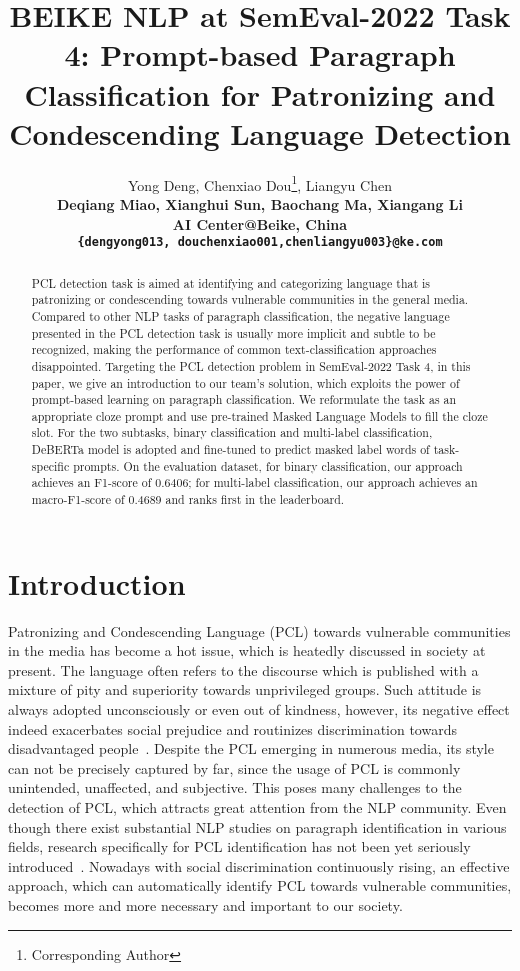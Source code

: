 \documentclass[11pt]{article}
\title{BEIKE NLP at SemEval-2022 Task 4: Prompt-based Paragraph Classification for Patronizing and Condescending Language Detection}
\author{Yong Deng, Chenxiao Dou\thanks{\quad Corresponding Author}, Liangyu Chen \\
  \bf{Deqiang Miao, Xianghui Sun, Baochang Ma, Xiangang Li} \\
  AI Center@Beike, China \\
  \texttt{\{dengyong013, douchenxiao001,chenliangyu003\}@ke.com}
}
\begin{document}
\maketitle


\begin{abstract}
  PCL detection task is aimed at identifying and categorizing language that is patronizing or condescending towards vulnerable communities in the general media. 
  Compared to other NLP tasks of paragraph classification, the negative language presented in the PCL detection task is usually more implicit and subtle to be recognized, making the performance of common text-classification approaches disappointed. 
  Targeting the PCL detection problem in SemEval-2022 Task 4, in this paper, we give an introduction to our team's solution, which exploits the power of prompt-based learning on paragraph classification.
  We reformulate the task as an appropriate cloze prompt and use pre-trained Masked Language Models to fill the cloze slot.
  For the two subtasks, binary classification and multi-label classification, DeBERTa model is adopted and fine-tuned to predict masked label words of task-specific prompts.
  On the evaluation dataset, for binary classification, our approach achieves an F1-score of 0.6406; for multi-label classification, our approach achieves an macro-F1-score of 0.4689 and ranks first in the leaderboard.
  
\end{abstract}



\section{Introduction}

Patronizing and Condescending Language (PCL) towards vulnerable communities in the media has become a hot issue, which is heatedly discussed in society at present.
The language often refers to the discourse which is published with a mixture of pity and superiority towards unprivileged groups.
Such attitude is always adopted unconsciously or even out of kindness, however, its negative effect indeed exacerbates social prejudice and routinizes discrimination towards disadvantaged people~\cite{ng2007language}. 
Despite the PCL emerging in numerous media, its style can not be precisely captured by far, since the usage of PCL is commonly unintended, unaffected, and subjective.
This poses many challenges to the detection of PCL, which attracts great attention from the NLP community.
Even though there exist substantial NLP studies on paragraph identification in various fields, research specifically for PCL identification has not been yet seriously introduced~\cite{perezalmendros2020dont}.
Nowadays with social discrimination continuously rising, an effective approach, which can automatically identify PCL towards vulnerable communities, becomes more and more necessary and important to our society. 
\end{document}
